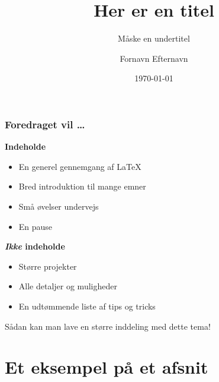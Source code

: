 \documentclass[handout]{beamer}
\title{Her er en titel}
\subtitle{\small Måske en undertitel}
\author{Fornavn Efternavn}
\date{\today}
\institute{%
  Aarhus Universitet
}
\newcommand{\plainbreak}[1]{\vspace{#1\baselineskip}}
\begin{document}
\begin{frame}[plain]

  \maketitle

\end{frame}


\begin{frame}
  \frametitle{Foredraget vil \dots}

  \textbf{Indeholde}
  \begin{itemize}
  \item En generel gennemgang af \LaTeX{}
  \item Bred introduktion til \alert{mange} emner
  \item Små øvelser undervejs
  \item En pause
  \end{itemize}

  \plainbreak1
  \pause

  \textbf{\textsl{Ikke} indeholde}
  \begin{itemize}
  \item Større projekter
  \item Alle detaljer og muligheder
  \item En udtømmende liste af tips og tricks
  \end{itemize}

\end{frame}


\begin{frame}[standout]
  Sådan kan man lave en større inddeling med dette tema!
\end{frame}


\section{Et eksempel på et afsnit}
\end{document}
